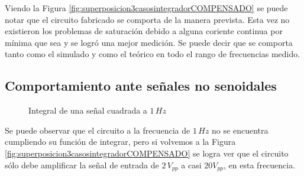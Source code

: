 \documentclass[11pt, a4paper]{article}
\begin{document}
Viendo la Figura \ref{fig:superposicion3casosintegradorCOMPENSADO} se puede notar que el circuito fabricado se comporta de la manera prevista. Esta vez no existieron los problemas de saturación debido a alguna coriente continua por mínima que sea y se logró una mejor medición. Se puede decir que se comporta tanto como el simulado y como el teórico en todo el rango de frecuencias medido.

\subsection{Comportamiento ante señales no senoidales}

\begin{figure}[H]
	\begin{center}
		\caption{Integral de una señal cuadrada a $1 \, Hz$}
		\label{fig:IntegralCOMP1Hz}
	\end{center}
\end{figure}

Se puede observar que el circuito a la frecuencia de $1 \, Hz$ no se encuentra cumpliendo su función de integrar, pero si volvemos a la Figura \ref{fig:superposicion3casosintegradorCOMPENSADO} se logra ver que el circuito sólo debe amplificar la señal de entrada de $2 \, V_{pp}$ a casi $20 V_{pp}$, en esta frecuencia.
\end{document}
